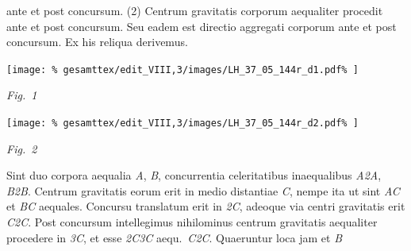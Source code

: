 %
ante et post concursum\protect{}. 
\pend
%
\pstart
(2) Centrum gravitatis\protect{} corporum aequaliter procedit%
\protect{}
ante et post concursum.\protect{} Seu eadem est directio 
aggregati corporum\protect{}%
\protect{} ante et post concursum.\protect{}
\pend
%
\pstart
Ex his reliqua derivemus.
\pend 
%
\vspace{1.5em} %
\centerline{%
\texttt{[image: \%
gesamttex/edit\_VIII,3/images/LH\_37\_05\_144r\_d1.pdf\%
]}} 
\vspace{0.5em}
\centerline{%
\lbrack\textit{Fig.~1}\rbrack%
}
%
%
\vspace{1.5em} %
\centerline{%
\texttt{[image: \%
gesamttex/edit\_VIII,3/images/LH\_37\_05\_144r\_d2.pdf\%
]}} 
\vspace{0.5em}
\centerline{%
\lbrack\textit{Fig.~2}\rbrack%
}
\vspace{1.2em}
%
\pstart
Sint duo corpora aequalia%
\protect{} \textit{A}, \textit{B},
concurrentia celeritatibus inaequalibus%
\protect{} \textit{A{\scriptsize2}A}, \textit{B{\scriptsize2}B}. %
Centrum gravitatis\protect{} eorum erit in
medio distantiae \textit{C}, nempe ita ut sint \textit{AC} et \textit{BC} aequales. Concursu%
\protect{} translatum erit in \textit{{\scriptsize2}C},
adeoque %
via centri gravitatis\protect{} erit \textit{C{\scriptsize2}C}. Post concursum%
\protect{} intellegimus nihilominus centrum
gravitatis\protect{} aequaliter procedere%
\protect{} in \textit{{\scriptsize3}C}, et esse \textit{{\scriptsize2}C{\scriptsize3}C} aequ.\ \textit{C{\scriptsize2}C}. 
%
Quaeruntur loca jam 
%
%
et \textit{B} 
%
